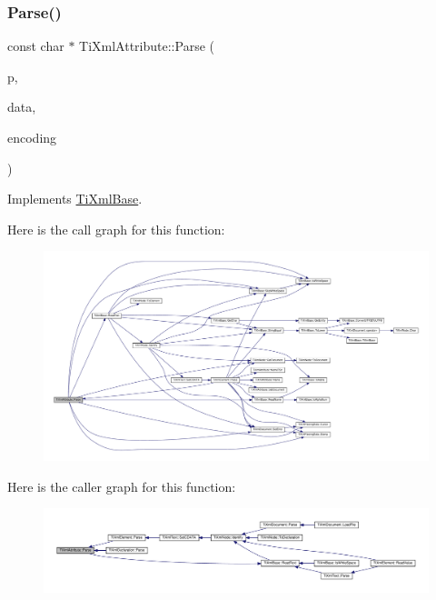 \subsubsection{\texorpdfstring{Parse()}{Parse()}}
{\footnotesize\ttfamily const char $\ast$ Ti\+Xml\+Attribute\+::\+Parse (\begin{DoxyParamCaption}\item[{const char $\ast$}]{p,  }\item[{\hyperlink{class_ti_xml_parsing_data}{Ti\+Xml\+Parsing\+Data} $\ast$}]{data,  }\item[{\hyperlink{tinyxml_8h_a88d51847a13ee0f4b4d320d03d2c4d96}{Ti\+Xml\+Encoding}}]{encoding }\end{DoxyParamCaption})\hspace{0.3cm}{\ttfamily [virtual]}}



Implements \hyperlink{class_ti_xml_base_a00e4edb0219d00a1379c856e5a1d2025}{Ti\+Xml\+Base}.

Here is the call graph for this function\+:
\nopagebreak
\begin{figure}[H]
\begin{center}
\leavevmode
\includegraphics[width=350pt]{class_ti_xml_attribute_ad62774421b814894b995af3b5d231dda_cgraph}
\end{center}
\end{figure}
Here is the caller graph for this function\+:
\nopagebreak
\begin{figure}[H]
\begin{center}
\leavevmode
\includegraphics[width=350pt]{class_ti_xml_attribute_ad62774421b814894b995af3b5d231dda_icgraph}
\end{center}
\end{figure}
\mbox{\label{class_ti_xml_attribute_afc7bbfdf83d59fbc4ff5e283d27b5d7d}} 
